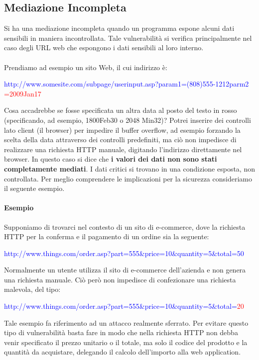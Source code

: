 \subsection{Mediazione Incompleta}
Si ha una mediazione incompleta quando un programma espone alcuni dati sensibili in maniera incontrollata. Tale vulnerabilità si verifica principalmente nel caso degli URL web che espongono i dati sensibili al loro interno. \\ \\
Prendiamo ad esempio un sito Web, il cui indirizzo è:
\begin{center}
\textcolor{blue}{http://www.somesite.com/subpage/userinput.asp?param1=(808)555-1212parm2} \textcolor{red}{=2009Jan17}
\end{center}
Cosa accadrebbe se fosse specificata un altra data al posto del testo in rosso (specificando, ad esempio, 1800Feb30 o  2048 Min32)? Potrei inserire dei controlli lato client (il browser) per impedire il buffer overflow, ad esempio forzando la scelta della data attraverso dei controlli predefiniti, ma ciò non impedisce di realizzare una richiesta HTTP manuale, digitando l'indirizzo direttamente nel browser. In questo caso si dice che \textbf{i valori dei dati non sono stati completamente mediati}. I dati critici si trovano in una condizione esposta, non controllata. Per meglio comprendere le implicazioni per la sicurezza consideriamo il seguente esempio.

\paragraph{Esempio} 
Supponiamo di trovarci nel contesto di un sito di e-commerce, dove la richiesta HTTP per la conferma e il pagamento di un ordine sia la seguente:
\begin{center}
\textcolor{blue}{http://www.things.com/order.asp?part=555\&price=10\&quantity=5\&total=50}
\end{center}
Normalmente un utente utilizza il sito di e-commerce dell'azienda e non genera una richiesta manuale. Ciò però non impedisce di confezionare una richiesta malevola, del tipo:
\begin{center}
\textcolor{blue}{http://www.things.com/order.asp?part=555\&price=10\&quantity=5\&total=}\textcolor{red}{20}
\end{center}
Tale esempio fa riferimento ad un attacco realmente sferrato. Per evitare questo tipo di vulnerabilità basta fare in modo che nella richiesta HTTP non debba venir specificato il prezzo unitario o il totale, ma solo il codice del prodotto e la quantità da acquistare, delegando il calcolo dell'importo alla web application.

